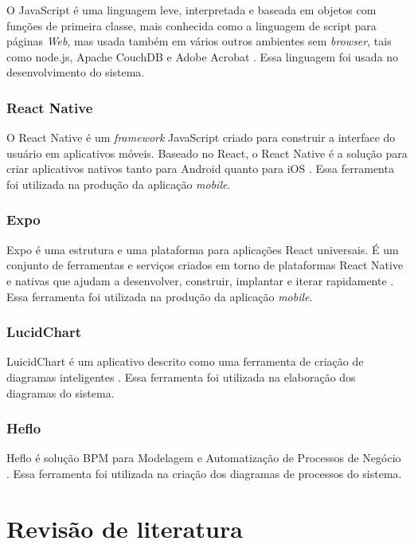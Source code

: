 O JavaScript é uma linguagem leve, interpretada e baseada em objetos com funções de primeira classe, mais conhecida como a linguagem de script para páginas \textit{Web}, mas usada também em vários outros ambientes sem \textit{browser}, tais como node.js,  Apache CouchDB e Adobe Acrobat \cite{mozilla2021}. Essa linguagem foi usada no desenvolvimento do sistema.


\subsection{React Native}
\label{reactNative}

O React Native é um \textit{framework} JavaScript criado para construir a interface do usuário em aplicativos móveis. Baseado no React, o React Native é a solução para criar aplicativos nativos tanto para Android quanto para iOS \cite{devmedia2021}. Essa ferramenta foi utilizada na produção da aplicação \textit{mobile}.

\subsection{Expo}
\label{expo}

Expo é uma estrutura e uma plataforma para aplicações React universais. É um conjunto de ferramentas e serviços criados em torno de plataformas React Native e nativas que ajudam a desenvolver, construir, implantar e iterar rapidamente \cite{expo2021}. Essa ferramenta foi utilizada na produção da aplicação \textit{mobile}.

\subsection{LucidChart}
\label{lucid}

LuicidChart é um aplicativo descrito como uma ferramenta de criação de diagramas inteligentes \cite{Lucid}. Essa ferramenta foi utilizada na elaboração dos diagramas do sistema.

\subsection{Heflo}
\label{heflo}

Heflo é solução BPM para Modelagem e Automatização de Processos de Negócio \cite{Venki}. Essa ferramenta foi utilizada na criação dos diagramas de processos do sistema.



\chapter{Revisão de literatura}
\label{chap:revisaoDeLiteratura}

